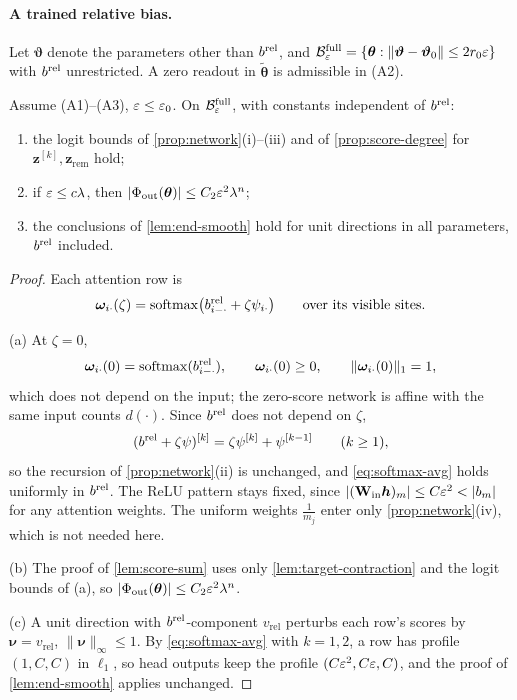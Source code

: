 \paragraph{A trained relative bias.} Let $\bm\vartheta$ denote the parameters other than $b^{\mathrm{rel}}$, and
$\mathcal B^{\mathrm{full}}_{\varepsilon}=\{\bm\theta:\|\bm\vartheta-\bm\vartheta_0\|\le2r_0\varepsilon\}$ with $b^{\mathrm{rel}}$ unrestricted. A zero readout in $\tilde{\bm\theta}$ is admissible in (A2).

\begin{lemma}
\label{lem:bias-uniform}
Assume (A1)--(A3), $\varepsilon\le\varepsilon_0$. On $\mathcal B^{\mathrm{full}}_{\varepsilon}$, with constants independent of $b^{\mathrm{rel}}$:
\begin{enumerate}[label=(\alph*),leftmargin=*,itemsep=1pt,topsep=2pt]
\item the logit bounds of \cref{prop:network}(i)--(iii) and of \cref{prop:score-degree} for $\bm z^{[k]},\bm z_{\mathrm{rem}}$ hold;
\item if $\varepsilon\le c\lambda$, then $|\Phi_{\mathrm{out}}(\bm\theta)|\le C_2\varepsilon^2\lambda^n$;
\item the conclusions of \cref{lem:end-smooth} hold for unit directions in all parameters, $b^{\mathrm{rel}}$ included.
\end{enumerate}
\end{lemma}

\begin{proof}
Each attention row is
\[
 \bm\omega_{i\cdot}(\zeta)=\operatorname{softmax}\bigl(b^{\mathrm{rel}}_{i-\cdot}+\zeta\psi_{i\cdot}\bigr)\qquad\text{over its visible sites.}
\]

\noindent(a) At $\zeta=0$,
\[
 \bm\omega_{i\cdot}(0)=\operatorname{softmax}(b^{\mathrm{rel}}_{i-\cdot}),\qquad \bm\omega_{i\cdot}(0)\ge0,\qquad \|\bm\omega_{i\cdot}(0)\|_1=1,
\]
which does not depend on the input; the zero-score network is affine with the same input counts $d(\cdot)$. Since $b^{\mathrm{rel}}$ does not
depend on $\zeta$,
\[
 (b^{\mathrm{rel}}+\zeta\psi)^{[k]}=\zeta\psi^{[k]}+\psi^{[k-1]}\qquad(k\ge1),
\]
so the recursion of \cref{prop:network}(ii) is unchanged, and \cref{eq:softmax-avg} holds uniformly in $b^{\mathrm{rel}}$. The ReLU pattern stays
fixed, since $|(\mathbf W_{\mathrm{in}}\bm h)_m|\le C\initscale^2<|b_m|$ for any attention weights. The uniform weights $\frac{1}{m_j}$ enter only
\cref{prop:network}(iv), which is not needed here.

\smallskip\noindent(b) The proof of \cref{lem:score-sum} uses only \cref{lem:target-contraction} and the logit bounds of (a), so
$|\Phi_{\mathrm{out}}(\bm\theta)|\le C_2\varepsilon^2\lambda^n$.

\smallskip\noindent(c) A unit direction with $b^{\mathrm{rel}}$-component $v_{\mathrm{rel}}$ perturbs each row's scores by $\bm\nu=v_{\mathrm{rel}}$, $\|\bm\nu\|_\infty\le1$. By
\cref{eq:softmax-avg} with $k=1,2$, a row has profile $(1,C,C)$ in $\ell_1$, so head outputs keep the profile $(C\varepsilon^2,C\varepsilon,C)$, and the
proof of \cref{lem:end-smooth} applies unchanged.
\end{proof}

